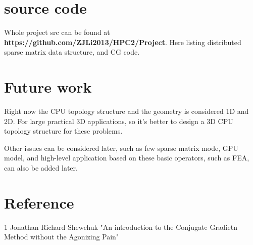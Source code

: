 \documentclass[11pt]{article}
\begin{document}
\section{source code}	
	Whole project src can be found at \textbf{https://github.com/ZJLi2013/HPC2/Project}. Here listing distributed sparse matrix data structure, and CG code.

	
	


\section {Future work}

	Right now the CPU topology structure and the geometry is considered 1D and 2D. For large practical 3D applications, so it's better to design a 3D CPU topology structure for these problems. 

	Other issues can be considered later, such as few sparse matrix mode, GPU model, and high-level application based on these basic operators, such as FEA, can also be added later. 	

\section {Reference}

	1 Jonathan Richard Shewchuk "An introduction to the Conjugate Gradietn Method without the Agonizing Pain"
\end{document}
